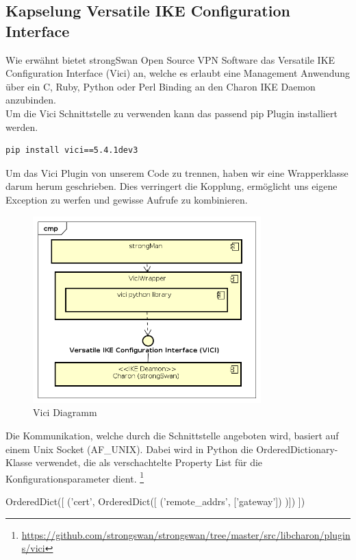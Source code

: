 \subsection{Kapselung Versatile
IKE Configuration Interface}
Wie erwähnt bietet strongSwan Open Source VPN Software das Versatile
IKE Configuration Interface (Vici) an, welche es erlaubt eine Management Anwendung über ein C, Ruby, Python oder Perl Binding an den Charon
IKE Daemon anzubinden.\\
Um die Vici Schnittstelle zu verwenden kann das passend pip Plugin installiert werden.
\\
\begin{lstlisting}[style=BashInputStyle]
	pip install vici==5.4.1dev3
\end{lstlisting}
\medskip
Um das Vici Plugin von unserem Code zu trennen, haben wir eine Wrapperklasse darum herum geschrieben. Dies verringert die Kopplung, ermöglicht uns eigene Exception zu werfen und gewisse Aufrufe zu kombinieren. \\
\begin{figure}[H]
\centering
\includegraphics[width=250pt]{images/vici_wrapper.png}
\caption[Vici Diagramm]{Vici Diagramm}
\end{figure}
\medskip
Die Kommunikation, welche durch die Schnittstelle angeboten wird, basiert auf einem Unix Socket (AF\_UNIX). Dabei wird in Python die OrderedDictionary-Klasse verwendet, die als verschachtelte Property List für die Konfigurationsparameter dient. \footnote{\url{https://github.com/strongswan/strongswan/tree/master/src/libcharon/plugins/vici}}\\

\begin{python}
OrderedDict([
	('cert', OrderedDict([
		('remote_addrs', ['gateway'])
	)])
])
\end{python}
